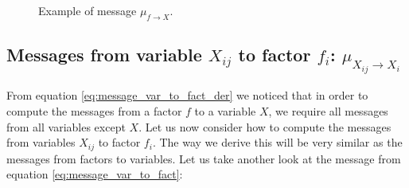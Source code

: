 \begin{exmp}
\begin{figure}[h!]

\caption{Example of message $\mu_{f \rightarrow X}$.}
\label{fig:message_to_fact_exmp}
\end{figure}
\end{exmp}


\subsection{Messages from variable $X_{ij}$ to factor $f_i$: 
$\mu_{X_{ij} \rightarrow X_i}$}
From equation \ref{eq:message_var_to_fact_der} we noticed that
in order to compute the messages from a factor $f$ to a variable $X$, 
we require all messages from all variables except $X$. Let us now consider
how to compute the messages from variables $X_{ij}$ to factor $f_i$.
The way we derive this will be very similar as the messages from
factors to variables. Let us take another look at the message
from equation \ref{eq:message_var_to_fact}:

